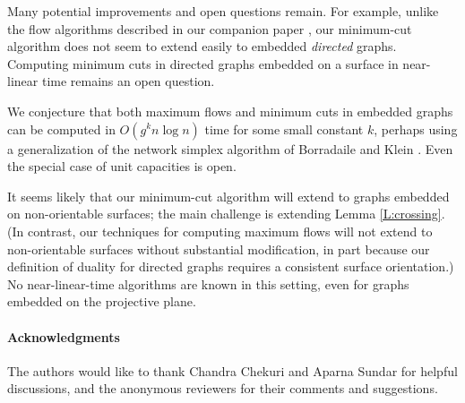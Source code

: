 \documentclass{sig-alternate}
\begin{document}
Many potential improvements and open questions remain.  For example, unlike the flow algorithms described in our companion paper \cite{cen-hfcc-09}, our minimum-cut algorithm does not seem to extend easily to embedded \emph{directed} graphs.  Computing minimum cuts in directed graphs embedded on a surface in near-linear time remains an open question.

We conjecture that both maximum flows and minimum cuts in embedded graphs can be computed in $O(g^k n\log n)$ time for some small constant $k$, perhaps using a
generalization of the network simplex algorithm of Borradaile and
Klein \cite{b-epnfc-08, bk-tamfd-06, bk-amfdp-09}.  Even the special
case of unit capacities is open.

It seems likely that our minimum-cut algorithm will extend to graphs embedded on non-orientable surfaces; the main challenge is extending Lemma \ref{L:crossing}.  (In contrast, our techniques for computing maximum flows will not extend to non-orientable surfaces without substantial modification, in part because our definition of duality for directed graphs requires a consistent surface orientation.)  No near-linear-time algorithms are known in this setting, even for graphs embedded on the projective plane.

\paragraph{Acknowledgments}
The authors would like to thank Chandra Chekuri and Aparna Sundar for helpful discussions, and the anonymous reviewers for their comments and suggestions.



\end{document}
